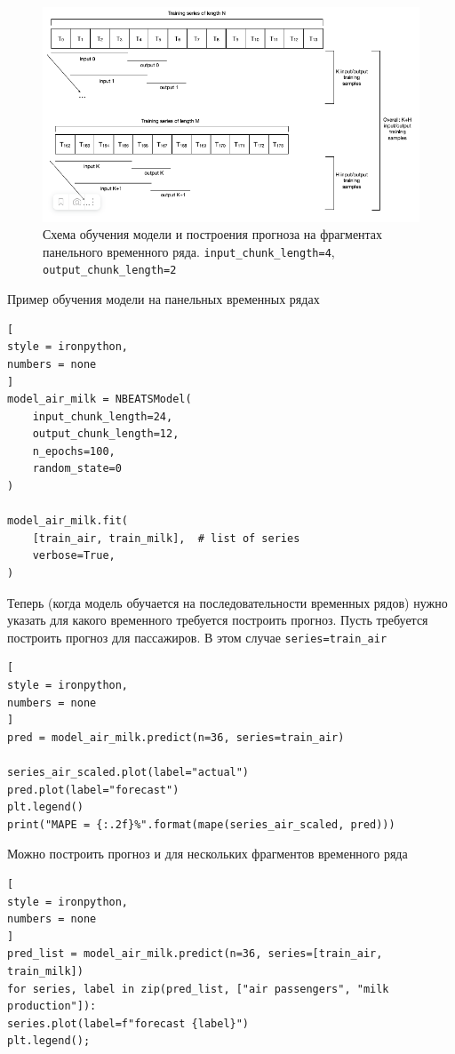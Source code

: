 \documentclass[%
	11pt,
	a4paper,
	utf8,
		]{article}
\begin{document}
\begin{figure}[h]
	\centering
	\includegraphics[scale=0.9 ]{figures/panel_ts.png}
	\caption{ Схема обучения модели и построения прогноза на фрагментах панельного временного ряда. \texttt{input\_chunk\_length=4}, \texttt{output\_chunk\_length=2} }\label{fig:panel_ts}
\end{figure}

Пример обучения модели на панельных временных рядах
\begin{lstlisting}[
style = ironpython,
numbers = none
]
model_air_milk = NBEATSModel(
    input_chunk_length=24,
    output_chunk_length=12,
    n_epochs=100,
    random_state=0
)

model_air_milk.fit(
    [train_air, train_milk],  # list of series
    verbose=True,
)
\end{lstlisting}

Теперь (когда модель обучается на последовательности временных рядов) нужно указать для какого временного требуется построить прогноз. Пусть требуется построить прогноз для пассажиров. В этом случае \verb|series=train_air|
\begin{lstlisting}[
style = ironpython,
numbers = none
]
pred = model_air_milk.predict(n=36, series=train_air)

series_air_scaled.plot(label="actual")
pred.plot(label="forecast")
plt.legend()
print("MAPE = {:.2f}%".format(mape(series_air_scaled, pred)))
\end{lstlisting}

Можно построить прогноз и для нескольких фрагментов временного ряда
\begin{lstlisting}[
style = ironpython,
numbers = none
]
pred_list = model_air_milk.predict(n=36, series=[train_air, train_milk])
for series, label in zip(pred_list, ["air passengers", "milk production"]):
series.plot(label=f"forecast {label}")
plt.legend();
\end{lstlisting}
\end{document}
